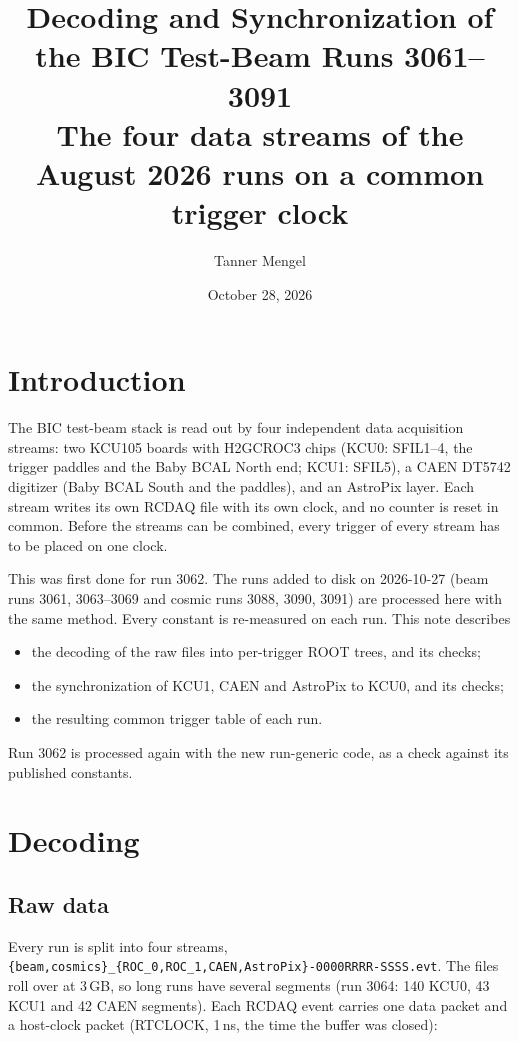 \documentclass[11pt]{article}
\title{Decoding and Synchronization of the BIC Test-Beam Runs 3061--3091\\[4pt]\large The four data streams of the August 2026 runs on a common trigger clock}
\author{Tanner Mengel}
\date{October 28, 2026}
\begin{document}
\maketitle

\section*{Introduction}

The BIC test-beam stack is read out by four independent data acquisition streams: two KCU105 boards with
H2GCROC3 chips (KCU0: SFIL1--4, the trigger paddles and the Baby BCAL North end; KCU1: SFIL5), a CAEN DT5742
digitizer (Baby BCAL South and the paddles), and an AstroPix layer. Each stream writes its own RCDAQ file with
its own clock, and no counter is reset in common. Before the streams can be combined, every trigger of every
stream has to be placed on one clock.

This was first done for run 3062. The runs added to disk on 2026-10-27 (beam runs 3061, 3063--3069 and
cosmic runs 3088, 3090, 3091) are processed here with the same method. Every constant is re-measured on each
run. This note describes
\begin{itemize}
  \item the decoding of the raw files into per-trigger ROOT trees, and its checks;
  \item the synchronization of KCU1, CAEN and AstroPix to KCU0, and its checks;
  \item the resulting common trigger table of each run.
\end{itemize}
Run 3062 is processed again with the new run-generic code, as a check against its published constants.


\section*{Decoding}

\subsection*{Raw data}

Every run is split into four streams, \texttt{\{beam,cosmics\}\_\{ROC\_0,ROC\_1,CAEN,AstroPix\}-0000RRRR-SSSS.evt}.
The files roll over at 3\,GB, so long runs have several segments (run 3064: 140 KCU0, 43 KCU1 and 42 CAEN
segments). Each RCDAQ event carries one data packet and a host-clock packet (RTCLOCK, 1\,ns, the time the
buffer was closed):
\end{document}
